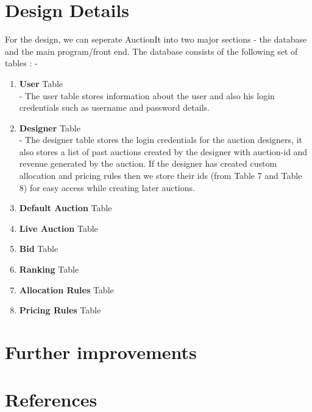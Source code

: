 \documentclass[a4paper]{article}
\begin{document}
\section*{Design Details}
For the design, we can seperate AuctionIt into two major sections -  the database and the main program/front end. The database consists of the following set of tables : - \\
\begin{enumerate}
    \item \textbf{User} Table\\
     - The user table stores information about the user and also his login credentials such as username and password details.
    \item \textbf{Designer} Table\\
    - The designer table stores the login credentials for the auction designers, it also stores a list of past auctions created by the designer with auction-id and revenue generated by the auction. If the designer has created custom allocation and pricing rules then we store their ids (from Table 7 and Table 8) for easy access while creating later auctions.
    \item \textbf{Default Auction} Table
    \item \textbf{Live Auction} Table
    \item \textbf{Bid} Table
    \item \textbf{Ranking} Table
    \item \textbf{Allocation Rules} Table
    \item \textbf{Pricing Rules} Table
\end{enumerate}
\section*{Further improvements}

\section*{References}
\end{document}
